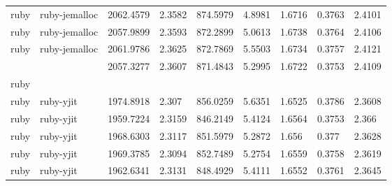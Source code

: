 \begin{longtable}[h]{|lllllllll|}
ruby           & ruby-jemalloc          & 2062.4579                 & 2.3582                                                               & 874.5979              & 4.8981           & 1.6716           & 0.3763       & 2.4101        \\
ruby           & ruby-jemalloc          & 2057.9899                 & 2.3593                                                               & 872.2899              & 5.0613           & 1.6738           & 0.3764       & 2.4106        \\
ruby           & ruby-jemalloc          & 2061.9786                 & 2.3625                                                               & 872.7869              & 5.5503           & 1.6734           & 0.3757       & 2.4121        \\
               &                        & 2057.3277                 & 2.3607                                                               & 871.4843              & 5.2995           & 1.6722           & 0.3753       & 2.4109        \\
ruby           &                        &                           &                                                                      &                       &                  &                  &              &               \\
ruby           & ruby-yjit              & 1974.8918                 & 2.307                                                                & 856.0259              & 5.6351           & 1.6525           & 0.3786       & 2.3608        \\
ruby           & ruby-yjit              & 1959.7224                 & 2.3159                                                               & 846.2149              & 5.4124           & 1.6564           & 0.3753       & 2.366         \\
ruby           & ruby-yjit              & 1968.6303                 & 2.3117                                                               & 851.5979              & 5.2872           & 1.656            & 0.377        & 2.3628        \\
ruby           & ruby-yjit              & 1969.3785                 & 2.3094                                                               & 852.7489              & 5.2754           & 1.6559           & 0.3758       & 2.3619        \\
ruby           & ruby-yjit              & 1962.6341                 & 2.3131                                                               & 848.4929              & 5.4111           & 1.6552           & 0.3761       & 2.3645        \\

\end{longtable}
